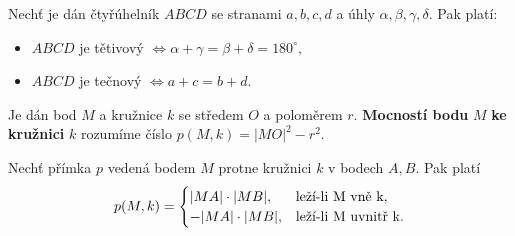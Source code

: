 \begin{veta}
  Nechť je dán čtyřúhelník $ABCD$ se stranami $a,b,c,d$ a úhly $\alpha, \beta, \gamma, \delta.$ Pak platí:
  \begin{itemize}
    \item $ABCD$ je tětivový $\iff \alpha + \gamma=\beta+\delta=180^\circ,$
    \item $ABCD$ je tečnový $\iff a+c=b+d.$
  \end{itemize}
\end{veta}

\begin{definition}
  Je dán bod $M$ a kružnice $k$ se středem $O$ a poloměrem $r$. \textbf{Mocností bodu} $M$ \textbf{ke kružnici} $k$ rozumíme číslo $p(M, k) = |MO|^2-r^2.$
\end{definition}

\begin{veta}
  Nechť přímka $p$ vedená bodem $M$ protne kružnici $k$ v bodech $A,B$. Pak platí
  \[
    p(M,k)=
    \begin{cases}
      |MA|\cdot |MB|, & \text{leží-li } $M$ \text{ vně } $k$, \\
      -|MA|\cdot |MB|, & \text{leží-li } $M$ \text{ uvnitř } $k$.
    \end{cases}
  \]
\end{veta}
